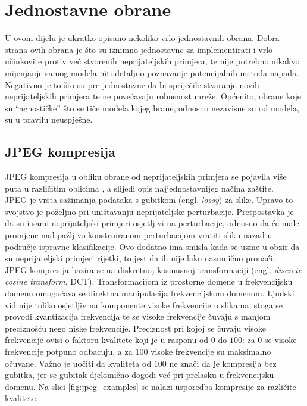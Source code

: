 \documentclass[utf8, diplomski]{fer}
\begin{document}
\section{Jednostavne obrane}
U ovom dijelu je ukratko opisano nekoliko vrlo jednostavnih obrana. Dobra strana ovih obrana je što su iznimno jednostavne za implementirati i vrlo učinkovite protiv već stvorenih neprijateljskih primjera, te nije potrebno nikakvo mijenjanje samog modela niti detaljno poznavanje potencijalnih metoda napada. Negativno je to što su pre-jednostavne da bi spriječile stvaranje novih neprijateljskih primjera te ne povećavaju robusnost mreže. Općenito, obrane koje su ``agnostičke'' što se tiče modela kojeg brane, odnosno nezavisne su od modela, su u pravilu neuspješne.
\subsection{JPEG kompresija}\label{jpeg_comp}
JPEG kompresija u obliku obrane od neprijateljskih primjera se pojavila više puta u različitim oblicima \citep{jpeg1, jpeg2, jpeg3}, a slijedi opis najjednostavnijeg načina zaštite. \\
JPEG je vrsta sažimanja podataka s gubitkom (engl. \textit{lossy}) za slike. Upravo to svojstvo je poželjno pri uništavanju neprijateljske perturbacije. Pretpostavka je da su i sami neprijateljski primjeri osjetljivi na perturbacije, odnosno da će male promjene nad pažljivo-konstruiranom perturbacijom vratiti sliku nazad u područje ispravne klasifikacije. Ovo dodatno ima smisla kada se uzme u obzir da su neprijateljski primjeri rijetki, to jest da ih nije lako nasumično pronaći. \\
JPEG kompresija bazira se na diskretnoj kosinusnoj transformaciji (engl. \textit{discrete cosine transform}, DCT). Transformacijom iz prostorne domene u frekvencijsku domenu omogućava se direktna manipulacija frekvencijskom domenom. Ljudski vid nije toliko osjetljiv na komponente visoke frekvencije u slikama, stoga se provodi kvantizacija frekvencija te se visoke frekvencije čuvaju s manjom preciznošću nego niske frekvencije. Preciznost pri kojoj se čuvaju visoke frekvencije ovisi o faktoru kvalitete koji je u rasponu od $0$ do $100$: za $0$ se visoke frekvencije potpuno odbacuju, a za $100$ visoke frekvencije su maksimalno očuvane. Važno je uočiti da kvaliteta od $100$ ne znači da je kompresija bez gubitka, jer se gubitak djelomično dogodi već pri prelasku u frekvencijsku domenu. Na slici \ref{fig:jpeg_examples} se nalazi usporedba kompresije za različite kvalitete.
\end{document}
